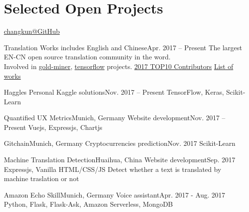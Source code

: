 \section{\textbf{Selected Open Projects}}
  \resumeSubHeadingListStart

    {\href{https://github.com/changkun/}{changkun@GitHub}}

    \resumeSubheading
      {Translation Works}{}
      {includes English and Chinese}{Apr. 2017 -- Present}
      \resumeItemListStart
          {The largest EN-CN open source translation community in the word. \\Involved in \href{https://github.com/xitu/gold-miner/}{gold-miner}, \href{https://github.com/xitu/tensorflow}{tensorflow} projects. \href{https://juejin.im/post/5a71284c6fb9a01ca87245a7}{2017 TOP10 Contributors}}
          {\href{https://github.com/changkun/translation}{List of works}}
      \resumeItemListEnd

    \resumeSubheading
      {Haggles}{}
      {Personal Kaggle solutions}{Nov. 2017 -- Present}
      \resumeItemListStart
          {TensorFlow, Keras, Scikit-Learn}
      \resumeItemListEnd

    \resumeSubheading
      {Quantified UX Metrics}{Munich, Germany}
      {Website development}{Nov. 2017 -- Present}
      \resumeItemListStart
          {Vuejs, Expressjs, Chartjs}
      \resumeItemListEnd

    \resumeSubheading
      {Gitchain}{Munich, Germany}
      {Cryptocurrencies prediction}{Nov. 2017}
      \resumeItemListStart
          {Scikit-Learn}
      \resumeItemListEnd

    \resumeSubheading
      {Machine Translation Detection}{Huaihua, China}
      {Website development}{Sep. 2017}
      \resumeItemListStart
          {Expressjs, Vanilla HTML/CSS/JS}
          {Detect whether a text is translated by machine traslation or not}
      \resumeItemListEnd

    \resumeSubheading
      {Amazon Echo Skill}{Munich, Germany}
      {Voice assistant}{Apr. 2017 - Aug. 2017}
      \resumeItemListStart
          {Python, Flask, Flask-Ask, Amazon Serverless, MongoDB}
      \resumeItemListEnd

